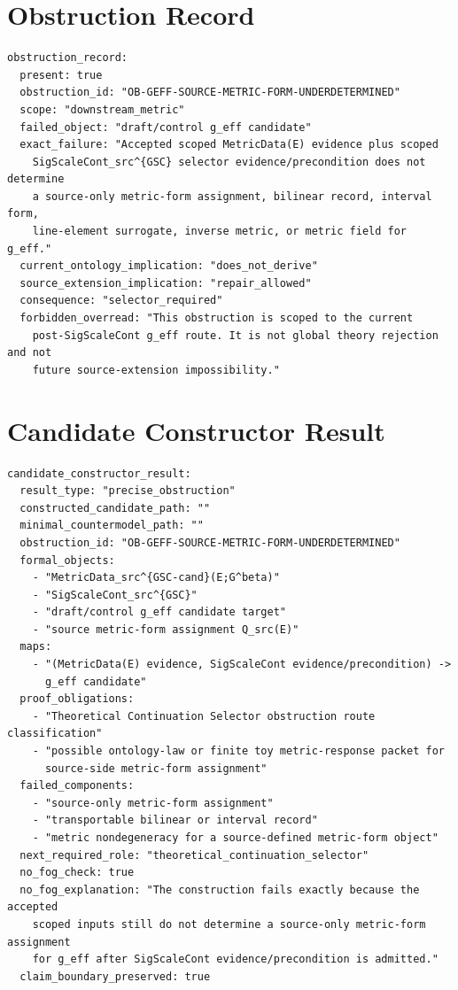 \documentclass[11pt]{article}
\begin{document}
\section{Obstruction Record}

\begin{verbatim}
obstruction_record:
  present: true
  obstruction_id: "OB-GEFF-SOURCE-METRIC-FORM-UNDERDETERMINED"
  scope: "downstream_metric"
  failed_object: "draft/control g_eff candidate"
  exact_failure: "Accepted scoped MetricData(E) evidence plus scoped
    SigScaleCont_src^{GSC} selector evidence/precondition does not determine
    a source-only metric-form assignment, bilinear record, interval form,
    line-element surrogate, inverse metric, or metric field for g_eff."
  current_ontology_implication: "does_not_derive"
  source_extension_implication: "repair_allowed"
  consequence: "selector_required"
  forbidden_overread: "This obstruction is scoped to the current
    post-SigScaleCont g_eff route. It is not global theory rejection and not
    future source-extension impossibility."
\end{verbatim}

\section{Candidate Constructor Result}

\begin{verbatim}
candidate_constructor_result:
  result_type: "precise_obstruction"
  constructed_candidate_path: ""
  minimal_countermodel_path: ""
  obstruction_id: "OB-GEFF-SOURCE-METRIC-FORM-UNDERDETERMINED"
  formal_objects:
    - "MetricData_src^{GSC-cand}(E;G^beta)"
    - "SigScaleCont_src^{GSC}"
    - "draft/control g_eff candidate target"
    - "source metric-form assignment Q_src(E)"
  maps:
    - "(MetricData(E) evidence, SigScaleCont evidence/precondition) ->
      g_eff candidate"
  proof_obligations:
    - "Theoretical Continuation Selector obstruction route classification"
    - "possible ontology-law or finite toy metric-response packet for
      source-side metric-form assignment"
  failed_components:
    - "source-only metric-form assignment"
    - "transportable bilinear or interval record"
    - "metric nondegeneracy for a source-defined metric-form object"
  next_required_role: "theoretical_continuation_selector"
  no_fog_check: true
  no_fog_explanation: "The construction fails exactly because the accepted
    scoped inputs still do not determine a source-only metric-form assignment
    for g_eff after SigScaleCont evidence/precondition is admitted."
  claim_boundary_preserved: true
\end{verbatim}
\end{document}
